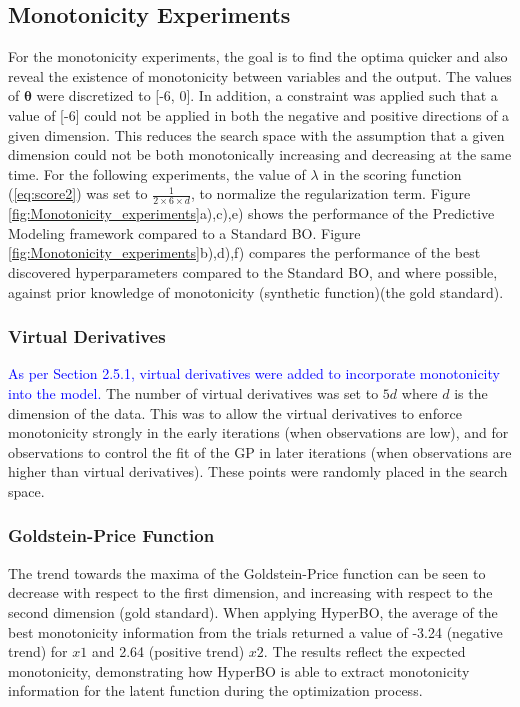 \subsection{Monotonicity Experiments}
For the monotonicity experiments, the goal is to find the optima quicker and also reveal the existence of monotonicity between variables and the output. The values of $\boldsymbol{\theta}$ were discretized to [-6, 0]. In addition, a constraint was applied such that a value of [-6] could not be applied in both the negative and positive directions of a given dimension. This reduces the search space with the assumption that a given dimension could not be both monotonically increasing and decreasing at the same time. For the following experiments, the value of $\lambda$ in the scoring function (\ref{eq:score2}) was set to $\frac{1}{2 \times 6 \times d}$, to normalize the regularization term. Figure \ref{fig:Monotonicity_experiments}a),c),e) shows the performance of the Predictive Modeling framework compared to a Standard BO. Figure \ref{fig:Monotonicity_experiments}b),d),f) compares the performance of the best discovered hyperparameters compared to the Standard BO, and where possible, against prior knowledge of monotonicity (synthetic function)(the gold standard).

\subsubsection{Virtual Derivatives}
\textcolor{blue}{As per Section 2.5.1, virtual derivatives were added to incorporate monotonicity into the model.} The number of virtual derivatives was set to $5d$ where $d$ is the dimension of the data. This was to allow the virtual derivatives to enforce monotonicity strongly in the early iterations (when observations are low), and for observations to control the fit of the GP in later iterations (when observations are higher than virtual derivatives). These points were randomly placed in the search space.

\subsubsection{Goldstein-Price Function}
The trend towards the maxima of the Goldstein-Price function can be seen to decrease with respect to the first dimension, and increasing with respect to the second dimension (gold standard). When applying HyperBO, the average of the best monotonicity information from the trials returned a value of -3.24 (negative trend) for $x1$ and 2.64 (positive trend) $x2$. The results reflect the expected monotonicity, demonstrating how HyperBO is able to extract monotonicity information for the latent function during the optimization process.

